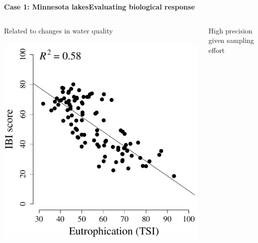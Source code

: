 \documentclass[serif]{beamer}\usepackage[]{graphicx}\usepackage[]{color}
\begin{document}
\begin{frame}{\textbf{Case 1: Minnesota lakes}}{\textbf{Evaluating biological response}}
\begin{columns}
\onslide<+->
\begin{column}{0.5\textwidth}
\begin{center}
Related to changes in water quality \\~\\
\includegraphics[width=\textwidth]{fig/Beck_GEDsem-ibi_tsi.pdf}
\end{center}
\end{column}
\onslide<+->
\begin{column}{0.5\textwidth}
\begin{center}
High precision given sampling effort \\~\\

\end{center}
\end{column}
\end{columns}
\end{frame}
\end{document}
